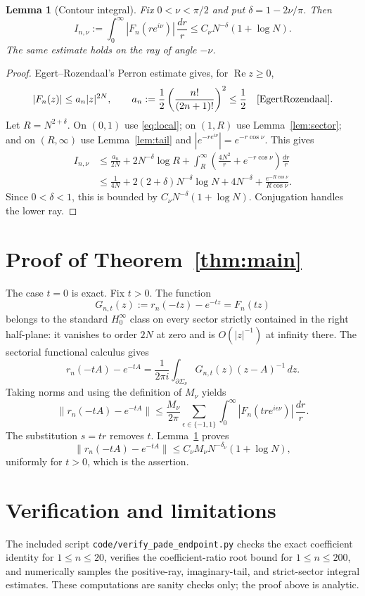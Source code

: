 \documentclass[11pt]{article}
\newtheorem{lemma}[theorem]{Lemma}
\newcommand{\Sigmaa}{\Sigma}
\begin{document}
\begin{lemma}[Contour integral]\label{lem:integral}
Fix $0<\nu<\pi/2$ and put $\delta=1-2\nu/\pi$. Then
\[
 I_{n,\nu}:=\int_0^\infty |F_n(re^{i\nu})|\,\frac{dr}{r}
 \leq C_\nu N^{-\delta}(1+\log N).
\]
The same estimate holds on the ray of angle $-\nu$.
\end{lemma}
\begin{proof}
Egert--Rozendaal's Perron estimate gives, for $\operatorname{Re}z\geq0$,
\begin{equation}\label{eq:local}
 |F_n(z)|\leq a_n|z|^{2N},\qquad
 a_n:=\frac12\left(\frac{n!}{(2n+1)!}\right)^2\leq\frac12
 \quad\cite[Lemma 3.2]{EgertRozendaal}.
\end{equation}
Let $R=N^{2+\delta}$. On $(0,1)$ use \eqref{eq:local}; on $(1,R)$ use
Lemma~\ref{lem:sector}; and on $(R,\infty)$ use Lemma~\ref{lem:tail} and
$|e^{-re^{i\nu}}|=e^{-r\cos\nu}$. This gives
\begin{align*}
 I_{n,\nu}
 &\leq \frac{a_n}{2N}+2N^{-\delta}\log R
   +\int_R^\infty
       \left(\frac{4N^2}{r}+e^{-r\cos\nu}\right)\frac{dr}{r}\\
 &\leq \frac1{4N}+2(2+\delta)N^{-\delta}\log N
   +4N^{-\delta}+\frac{e^{-R\cos\nu}}{R\cos\nu}.
\end{align*}
Since $0<\delta<1$, this is bounded by
$C_\nu N^{-\delta}(1+\log N)$. Conjugation handles the lower ray.
\end{proof}

\section{Proof of Theorem~\ref{thm:main}}
The case $t=0$ is exact. Fix $t>0$. The function
\[
 G_{n,t}(z):=r_n(-tz)-e^{-tz}=F_n(tz)
\]
belongs to the standard $H_0^\infty$ class on every sector strictly contained
in the right half-plane: it vanishes to order $2N$ at zero and is
$O(|z|^{-1})$ at infinity there. The sectorial functional calculus gives
\[
 r_n(-tA)-e^{-tA}
 =\frac1{2\pi i}\int_{\partial\Sigmaa_\nu}
      G_{n,t}(z)(z-A)^{-1}\,dz.
\]
Taking norms and using the definition of $M_\nu$ yields
\[
 \|r_n(-tA)-e^{-tA}\|
 \leq\frac{M_\nu}{2\pi}\sum_{\epsilon\in\{-1,1\}}
 \int_0^\infty |F_n(tre^{i\epsilon\nu})|\,\frac{dr}{r}.
\]
The substitution $s=tr$ removes $t$. Lemma~\ref{lem:integral} proves
\[
 \|r_n(-tA)-e^{-tA}\|
 \leq C_\nu M_\nu N^{-\delta_\nu}(1+\log N),
\]
uniformly for $t>0$, which is the assertion.

\section{Verification and limitations}
The included script \texttt{code/verify\_pade\_endpoint.py} checks the exact
coefficient identity for $1\leq n\leq20$, verifies the coefficient-ratio root
bound for $1\leq n\leq200$, and numerically samples the positive-ray,
imaginary-tail, and strict-sector integral estimates. These computations are
sanity checks only; the proof above is analytic.
\end{document}
